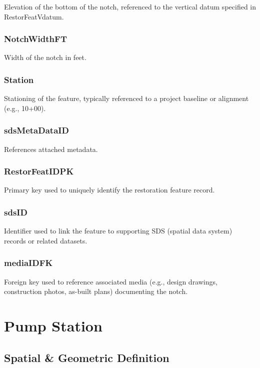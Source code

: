 \documentclass[
  letterpaper,
  DIV=11,
  numbers=noendperiod]{scrreprt}
\begin{document}
Elevation of the bottom of the notch, referenced to the vertical datum
specified in RestorFeatVdatum.

\subsection{NotchWidthFT}\label{notchwidthft}

Width of the notch in feet.

\subsection{Station}\label{station-1}

Stationing of the feature, typically referenced to a project baseline or
alignment (e.g., 10+00).

\subsection{sdsMetaDataID}\label{sdsmetadataid-9}

References attached metadata.

\subsection{RestorFeatIDPK}\label{restorfeatidpk-9}

Primary key used to uniquely identify the restoration feature record.

\subsection{sdsID}\label{sdsid-9}

Identifier used to link the feature to supporting SDS (spatial data
system) records or related datasets.

\subsection{mediaIDFK}\label{mediaidfk-9}

Foreign key used to reference associated media (e.g., design drawings,
construction photos, as-built plans) documenting the notch.

\chapter{Pump Station}\label{pump-station}

\section{Spatial \& Geometric
Definition}\label{spatial-geometric-definition-10}
\end{document}
